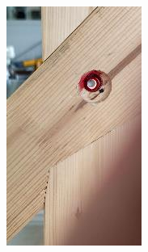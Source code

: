 \documentclass[11pt]{book}
\begin{document}
\begin{figure}[H]
\centering
\begin{subfigure}[b]{0.45\textwidth}
\centering
\includegraphics[width=\textwidth]{./images/image87.jpeg}
\end{subfigure}
\hfill
\begin{subfigure}[b]{0.45\textwidth}
\centering

\end{subfigure}
\end{figure}
\end{document}
